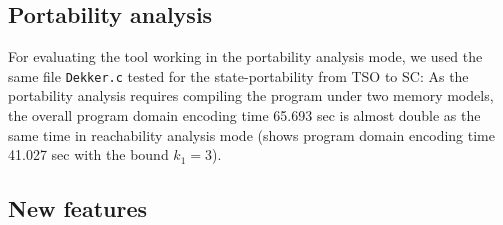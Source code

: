 %





\subsection{Portability analysis}
\label{ch:eval:perf:port}

For evaluating the tool working in the portability analysis mode, we used the same file \texttt{Dekker.c} tested for the state-portability from TSO to SC: %
As the portability analysis requires compiling the program under two memory models, the overall program domain encoding time 65.693 sec is almost double as the same time in reachability analysis mode (\porthos[1] shows program domain encoding time 41.027 sec with the bound $k_1=3$).


\subsection{New features}
\label{ch:eval:perf:feat}

